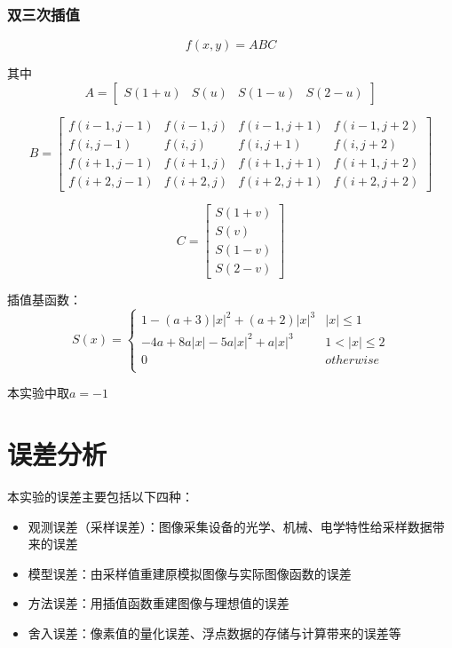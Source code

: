 \documentclass{article}
\begin{document}
\subsubsection{双三次插值}

$$f(x,y) = ABC$$

其中
\begin{equation}
	A=
	\begin{bmatrix} 
		S(1+u) & S(u) & S(1-u) & S(2-u)
	\end{bmatrix}
\end{equation}

\begin{equation}
	B=
	\begin{bmatrix} 
		f(i-1,j-1) & f(i-1,j) & f(i-1,j+1) & f(i-1,j+2)\\
		f(i,j-1) & f(i,j) & f(i,j+1) & f(i,j+2)\\
		f(i+1,j-1) & f(i+1,j) & f(i+1,j+1) & f(i+1,j+2)\\
		f(i+2,j-1) & f(i+2,j) & f(i+2,j+1) & f(i+2,j+2)
	\end{bmatrix}
\end{equation}

\begin{equation}
	C=
	\begin{bmatrix} 
		S(1+v) \\ S(v) \\ S(1-v) \\ S(2-v)
	\end{bmatrix}
\end{equation}

插值基函数：
\begin{equation}
	S(x)=
	\begin{cases}
		1 - (a+3)|x|^2 + (a+2)|x|^3 & |x| \leqslant 1\\
		-4a + 8a|x| - 5a|x|^2 + a|x|^3 & 1 < |x| \leqslant 2\\
		0 & otherwise\\
	\end{cases}
\end{equation}

本实验中取$a = -1$

\section{误差分析}
\setcounter{figure}{0}

\noindent 本实验的误差主要包括以下四种：
\begin{itemize}
	\item 观测误差（采样误差）：图像采集设备的光学、机械、电学特性给采样数据带来的误差
	\item 模型误差：由采样值重建原模拟图像与实际图像函数的误差
	\item 方法误差：用插值函数重建图像与理想值的误差
	\item 舍入误差：像素值的量化误差、浮点数据的存储与计算带来的误差等
\end{itemize}
\end{document}
